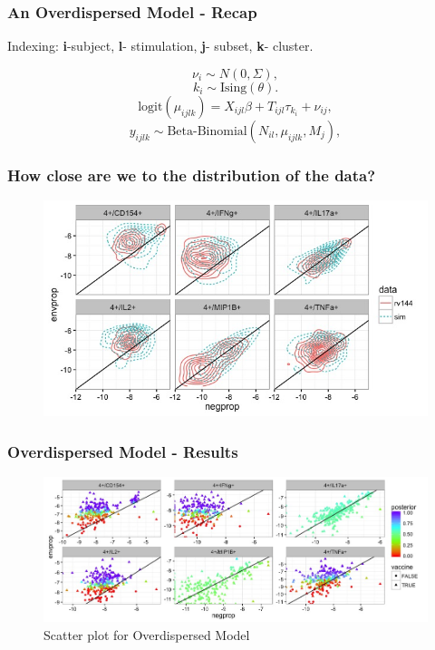 \documentclass{beamer}
\theoremstyle{definition}
\begin{document}

\begin{frame}
\frametitle{An Overdispersed Model - Recap}
\begin{framed}
Indexing: \textbf{i}-subject, \textbf{l}- stimulation, \textbf{j}- subset, \textbf{k}- cluster.
\end{framed}

$$
\nu_i \sim N(0, \Sigma),
$$$$
k_i \sim \text{Ising}(\theta).
$$$$
\text{logit}(\mu_{ijlk}) = X_{ijl} \beta + T_{ijl}\tau_{k_i} + \nu_{ij} ,
$$$$
y_{ijlk} \sim \text{Beta-Binomial}(N_{il}, \mu_{ijlk}, M_j) ,
$$
\end{frame}


\begin{frame}
\frametitle{How close are we to the distribution of the data?}
\begin{figure}[]
\includegraphics[width=12 cm]{figures/simVsRealContour} 
\end{figure}
\end{frame}


\begin{frame}
\frametitle{Overdispersed Model - Results}
\begin{figure}[]
\includegraphics[width=12 cm]{figures/marginalBBscatter} \caption{Scatter plot for Overdispersed Model }
\end{figure}
\end{frame}
\end{document}
